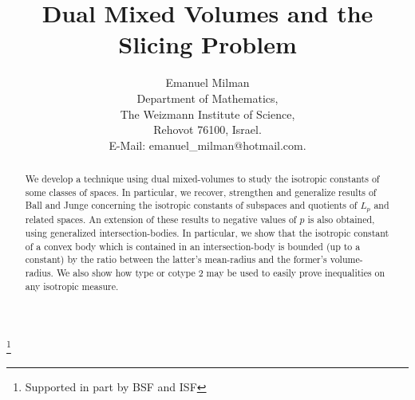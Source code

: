 \documentclass[12pt,oneside]{amsart}
\theoremstyle{definition}
\theoremstyle{remark}
\theoremstyle{proof}
\numberwithin{equation}{section}
\begin{document}

%


\title{Dual Mixed Volumes and the Slicing Problem}
\author{Emanuel Milman\\ \bigskip {}   \fontsize{10}{0} \selectfont
Department of Mathematics, \\
The Weizmann Institute of Science, \\Rehovot 76100, Israel. \\
\medskip E-Mail: emanuel\_milman@hotmail.com.}
\thanks{Supported in part by BSF and ISF}
\begin{abstract}
We develop a technique using dual mixed-volumes to study the
isotropic constants of some classes of spaces. In particular, we
recover, strengthen and generalize results of Ball and Junge
concerning the isotropic constants of subspaces and quotients of
$L_p$ and related spaces. An extension of these results to
negative values of $p$ is also obtained, using generalized
intersection-bodies. In particular, we show that the isotropic
constant of a convex body which is contained in an
intersection-body is bounded (up to a constant) by the ratio
between the latter's mean-radius and the former's volume-radius.
We also show how type or cotype 2 may be used to easily prove
inequalities on any isotropic measure.

\end{abstract}
\end{document}
